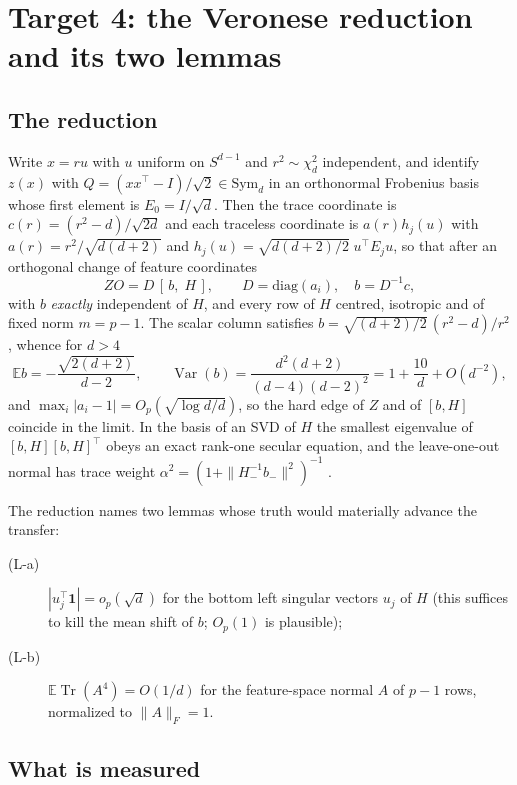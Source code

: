 \documentclass[11pt]{article}
\theoremstyle{definition}
\DeclareMathOperator{\Tr}{Tr}
\DeclareMathOperator{\Var}{Var}
\newcommand{\E}{\mathbb{E}}
\newcommand{\Sph}{S^{d-1}}
\begin{document}
\section{Target 4: the Veronese reduction and its two lemmas}\label{sec:t4}

\subsection{The reduction}

Write $x=ru$ with $u$ uniform on $\Sph$ and $r^2\sim\chi^2_d$ independent, and identify $z(x)$ with
$Q=(xx^\top-I)/\sqrt2\in\mathrm{Sym}_d$ in an orthonormal Frobenius basis whose first element is
$E_0=I/\sqrt d$. Then the trace coordinate is $c(r)=(r^2-d)/\sqrt{2d}$ and each traceless coordinate
is $a(r)h_j(u)$ with $a(r)=r^2/\sqrt{d(d+2)}$ and
$h_j(u)=\sqrt{d(d+2)/2}\;u^\top E_ju$, so that after an orthogonal change of feature coordinates
\begin{equation}
ZO=D\,[\,b,\;H\,],\qquad D=\mathrm{diag}(a_i),\quad b=D^{-1}c,
\label{eq:reduction}
\end{equation}
with $b$ \emph{exactly} independent of $H$, and every row of $H$ centred, isotropic and of fixed norm
$m=p-1$. The scalar column satisfies $b=\sqrt{(d+2)/2}\,(r^2-d)/r^2$, whence for $d>4$
\[
\E b=-\frac{\sqrt{2(d+2)}}{d-2},\qquad
\Var(b)=\frac{d^2(d+2)}{(d-4)(d-2)^2}=1+\frac{10}{d}+O(d^{-2}),
\]
and $\max_i|a_i-1|=O_p(\sqrt{\log d/d})$, so the hard edge of $Z$ and of $[b,H]$ coincide in the
limit. In the basis of an SVD of $H$ the smallest eigenvalue of $[b,H][b,H]^\top$ obeys an exact
rank-one secular equation, and the leave-one-out normal has trace weight
$\alpha^2=(1+\|H_-^{-1}b_-\|^2)^{-1}$ \cite{PN24}.

The reduction names two lemmas whose truth would materially advance the transfer:
\begin{description}
\item[(L-a)] $|u_j^\top\mathbf{1}|=o_p(\sqrt d)$ for the bottom left singular vectors $u_j$ of $H$
(this suffices to kill the mean shift of $b$; $O_p(1)$ is plausible);
\item[(L-b)] $\E\Tr(A^4)=O(1/d)$ for the feature-space normal $A$ of $p-1$ rows, normalized to
$\|A\|_F=1$.
\end{description}

\subsection{What is measured}
\end{document}
